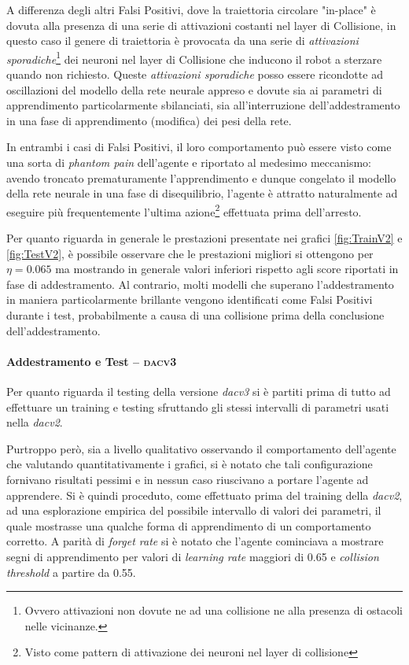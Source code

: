 A differenza degli altri Falsi Positivi, dove la traiettoria circolare "in-place" è dovuta alla presenza di una serie di attivazioni costanti nel layer di Collisione, in questo caso il genere di traiettoria è provocata da una serie di \textit{attivazioni sporadiche}\footnote{Ovvero attivazioni non dovute ne ad una collisione ne alla presenza di ostacoli nelle vicinanze.} dei neuroni nel layer di Collisione che inducono il robot a sterzare quando non richiesto. Queste \textit{attivazioni sporadiche} posso essere ricondotte ad oscillazioni del modello della rete neurale appreso e dovute sia ai parametri di apprendimento particolarmente sbilanciati, sia all'interruzione dell'addestramento in una fase di apprendimento (modifica) dei pesi della rete. 

In entrambi i casi di Falsi Positivi, il loro comportamento può essere visto come una sorta di \textit{phantom pain} dell'agente e riportato al medesimo meccanismo: avendo troncato prematuramente l'apprendimento e dunque congelato il modello della rete neurale in una fase di disequilibrio, l'agente è attratto naturalmente ad eseguire più frequentemente l'ultima azione\footnote{Visto come pattern di attivazione dei neuroni nel layer di collisione} effettuata prima dell'arresto.

Per quanto riguarda in generale le prestazioni presentate nei grafici \ref{fig:TrainV2} e \ref{fig:TestV2}, è possibile osservare che le prestazioni migliori si ottengono per $\eta=0.065$ ma mostrando in generale valori inferiori rispetto agli score riportati in fase di addestramento. Al contrario, molti modelli che superano l'addestramento in maniera particolarmente brillante vengono identificati come Falsi Positivi durante i test, probabilmente a causa di una collisione prima della conclusione dell'addestramento.

\newpage

\paragraph{Addestramento e Test -- \textsc{dacv3}} \label{par:dacv3}\hfill

Per quanto riguarda il testing della versione \textit{dacv3} si è partiti prima di tutto ad effettuare un training e testing sfruttando gli stessi intervalli di parametri usati nella \textit{dacv2}. 

Purtroppo però, sia a livello qualitativo osservando il comportamento dell'agente che valutando quantitativamente i grafici, si è notato che tali configurazione fornivano risultati pessimi e in nessun caso riuscivano a portare l'agente ad apprendere. 
Si è quindi proceduto, come effettuato prima del training della \textit{dacv2}, ad una esplorazione empirica del possibile intervallo di valori dei parametri, il quale mostrasse una qualche forma di apprendimento di un comportamento corretto. A parità di \textit{forget rate} si è notato che l'agente cominciava a mostrare segni di apprendimento per valori di \textit{learning rate} maggiori di 0.65 e \textit{collision threshold} a partire da 0.55. 

